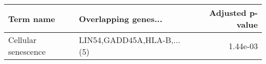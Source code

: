 \begin{tabular}{llr}
\toprule
          Term name &       Overlapping genes... &  Adjusted p-value \\
\midrule
Cellular senescence & LIN54,GADD45A,HLA-B,...(5) &          1.44e-03 \\
\bottomrule
\end{tabular}
